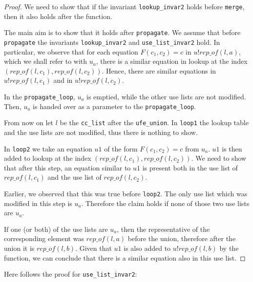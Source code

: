\begin{proof}
We need to show that if the invariant \lstinline{lookup_invar2} holds before \lstinline{merge}, then it also holds after the function.

The main aim is to show that it holds after \lstinline{propagate}.
We assume that before \lstinline{propagate} the invariants \lstinline{lookup_invar2} and \lstinline{use_list_invar2} hold.
In particular, we observe that for each equation $F(c_1, c_2) = c$ in $u ! rep\_of(l, a)$, which we shall refer to with $u_a$, there is a similar equation in lookup at the index $(rep\_of(l, c_1), rep\_of(l, c_2))$.
Hence, there are similar equations in $u ! rep\_of(l, c_1)$ and in $u ! rep\_of(l, c_2)$.

In the \lstinline{propagate_loop}, $u_a$ is emptied, while the other use lists are not modified. Then, $u_a$ is handed over as a parameter to the \lstinline{propagate_loop}.

From now on let $l$ be the \lstinline{cc_list} after the \lstinline{ufe_union}.
In \lstinline{loop1} the lookup table and the use lists are not modified, thus there is nothing to show.

In \lstinline{loop2} we take an equation $u1$ of the form $F(c_1, c_2) = c$ from $u_a$.
$u1$ is then added to lookup at the index $(rep\_of(l, c_1), rep\_of(l, c_2))$. We need to show that after this step, an equation similar to $u1$ is present both in the use list of $rep\_of(l, c_1)$ and the use list of $rep\_of(l, c_2)$.

Earlier, we observed that this was true before \lstinline{loop2}. The only use list which was modified in this step is $u_a$. Therefore the claim holds if none of those two use lists are $u_a$.

If one (or both) of the use lists are $u_a$, then the representative of the corresponding element was $rep\_of(l,a)$ before the union, therefore after the union it is $rep\_of(l,b)$. Given that $u1$ is also added to $u ! rep\_of(l, b)$ by the function, we can conclude that there is a similar equation also in this use list.
\end{proof}

Here follows the proof for \lstinline{use_list_invar2}:

